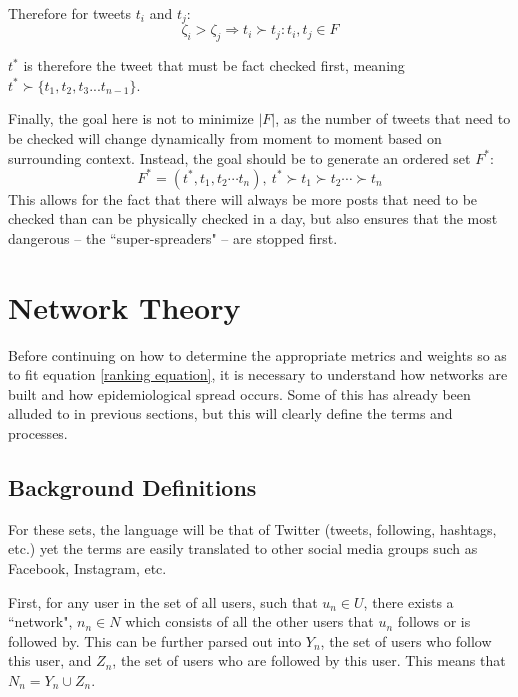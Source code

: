 \documentclass[preprint,review,12pt]{elsarticle}
\begin{document}
 Therefore for tweets $t_i$ and $t_j$: 
  \begin{equation}
  \label{ranking equation}
      \zeta_i > \zeta_j \Rightarrow t_i \succ t_j : t_i, t_j \in F
  \end{equation}
  
  $t^*$ is therefore the tweet that must be fact checked first, meaning  $t^* \succ \{t_1, t_2, t_3 ... t_{n-1}\}$. 
  
  Finally, the goal here is not to minimize $|F|$, as the number of tweets that need to be checked will change dynamically from moment to moment based on surrounding context. Instead, the goal should be to generate an ordered set $F^*$:
  \begin{equation}
      F^* = (t^*, t_1, t_2 \cdots t_n), \ t^* \succ t_1 \succ t_2 \cdots \succ t_n
  \end{equation}
  This allows for the fact that there will always be more posts that need to be checked than can be physically checked in a day, but also ensures that the most dangerous -- the ``super-spreaders" -- are stopped first.
  


\section{Network Theory}
\label{sec: Background Definitions}
Before continuing on how to determine the appropriate metrics and weights so as to fit equation \ref{ranking equation}, it is necessary to understand how networks are built and how epidemiological spread occurs. Some of this has already been alluded to in previous sections, but this will clearly define the terms and processes.

\subsection{Background Definitions}
For these sets, the language will be that of Twitter (tweets, following, hashtags, etc.) yet the terms are easily translated to other social media groups such as Facebook, Instagram, etc.

First, for any user in the set of all users, such that $u_n \in U$, there exists a ``network", $n_n \in N$ which consists of all the other users that $u_n$ follows or is followed by. This can be further parsed out into $Y_n$, the set of users who follow this user, and $Z_n$, the set of users who are followed by this user. This means that  $N_n = Y_n \cup Z_n$. 
\end{document}
